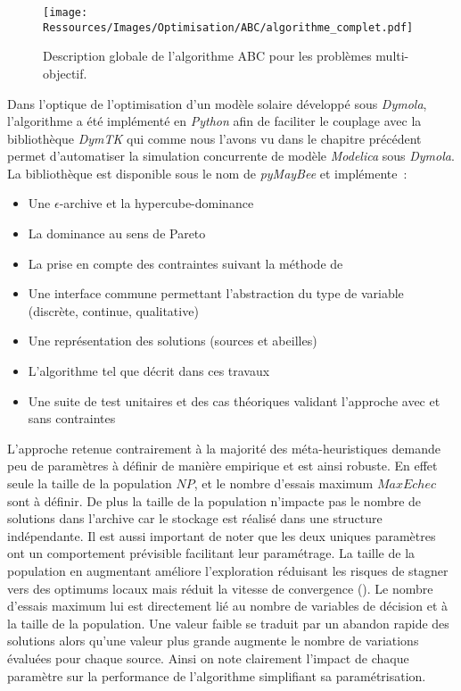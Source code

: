 \begin{figure}
    \centering
    \texttt{[image: Ressources/Images/Optimisation/ABC/algorithme\_complet.pdf]}
    \caption{Description globale de l’algorithme ABC pour les problèmes multi-objectif.}
    \label{fig:abc_complet}
\end{figure}

Dans l’optique de l’optimisation d’un modèle solaire développé sous \textit{Dymola}, l’algorithme
a été implémenté en \textit{Python} afin de faciliter le couplage avec la bibliothèque
\textit{DymTK} qui comme nous l’avons vu dans le chapitre précédent permet d’automatiser
la simulation concurrente de modèle \textit{Modelica} sous \textit{Dymola}. La bibliothèque est
disponible sous le nom de \textit{pyMayBee} et implémente~:
\begin{itemize}
  \item Une $\epsilon$-archive et la hypercube-dominance
  \item La dominance au sens de Pareto
  \item La prise en compte des contraintes suivant la méthode de \textcite{Woldesenbet20073077}
  \item Une interface commune permettant l’abstraction du type de variable (discrète, continue, qualitative)
  \item Une représentation des solutions (sources et abeilles)
  \item L’algorithme tel que décrit dans ces travaux
  \item Une suite de test unitaires et des cas théoriques validant l’approche avec
        et sans contraintes
\end{itemize}

L’approche retenue contrairement à la majorité des méta-heuristiques demande
peu de paramètres à définir de manière empirique et est ainsi robuste. En effet
seule la taille de la population $NP$, et le nombre d’essais maximum $MaxEchec$ sont à définir.
De plus la taille de la population n’impacte pas le nombre de solutions dans l’archive
car le stockage est réalisé dans une structure indépendante. Il est aussi important
de noter que les deux uniques paramètres ont un comportement prévisible facilitant
leur paramétrage. La taille de la population en augmentant améliore l’exploration
réduisant les risques de stagner vers des optimums locaux mais réduit la vitesse
de convergence ().
Le nombre d’essais maximum lui est directement lié au nombre de variables de décision
et à la taille de la population. Une valeur faible se traduit par un abandon rapide
des solutions alors qu’une valeur plus grande augmente le nombre de variations évaluées
pour chaque source. Ainsi on note clairement l’impact de chaque paramètre sur la
performance de l’algorithme simplifiant sa paramétrisation.

